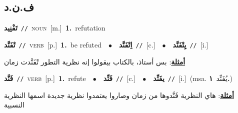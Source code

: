 \documentclass[10pt,a4paper,twoside]{article} %
\begin{document}
\begin{multicols}{2}
\vspace{-3mm}
\subsection*{\color{blue}\foreignlanguage{arabic}{ف.ن.د}\color{blue}{}} 

{\setlength\topsep{0pt}\textbf{\foreignlanguage{arabic}{تَفْنِيد}}\ {\color{gray}\texttt{//}\color{black}}\ \textsc{noun}\ [m.]\ \textbf{1.}~refutation\ } \vspace{2mm}

{\setlength\topsep{0pt}\textbf{\foreignlanguage{arabic}{تْفَنَّد}}\ {\color{gray}\texttt{//}\color{black}}\ \textsc{verb}\ [p.]\ \textbf{1.}~be refuted\ \ $\bullet$\ \ \setlength\topsep{0pt}\textbf{\foreignlanguage{arabic}{اِتْفَنَّد}}\ {\color{gray}\texttt{//}\color{black}}\ [c.]\ \ $\bullet$\ \ \setlength\topsep{0pt}\textbf{\foreignlanguage{arabic}{يِتْفَنَّد}}\ {\color{gray}\texttt{//}\color{black}}\ [i.]\  \begin{flushright}\color{gray}\foreignlanguage{arabic}{\textbf{\underline{\foreignlanguage{arabic}{أمثلة}}}: بس أستاذ، بالكتاب بيقولوا إنه نظرية التطور تْفَنَّدت زمان}\end{flushright}\color{black}} \vspace{2mm}

{\setlength\topsep{0pt}\textbf{\foreignlanguage{arabic}{فَنَّد}}\ {\color{gray}\texttt{//}\color{black}}\ \textsc{verb}\ [p.]\ \textbf{1.}~refute\ \ $\bullet$\ \ \setlength\topsep{0pt}\textbf{\foreignlanguage{arabic}{فَنِّد}}\ {\color{gray}\texttt{//}\color{black}}\ [c.]\ \ $\bullet$\ \ \setlength\topsep{0pt}\textbf{\foreignlanguage{arabic}{يفَنِّد}}\ {\color{gray}\texttt{//}\color{black}}\ [i.]\ \color{gray}(msa. \foreignlanguage{arabic}{يُفَنِّد}~\foreignlanguage{arabic}{\textbf{١.}})\color{black}\  \begin{flushright}\color{gray}\foreignlanguage{arabic}{\textbf{\underline{\foreignlanguage{arabic}{أمثلة}}}: هاي النظرية فَنَّدوها من زمان وصاروا يعتمدوا نظرية جديدة اسمها النظرية النسبية}\end{flushright}\color{black}} \vspace{2mm}


\end{multicols}
\end{document}
